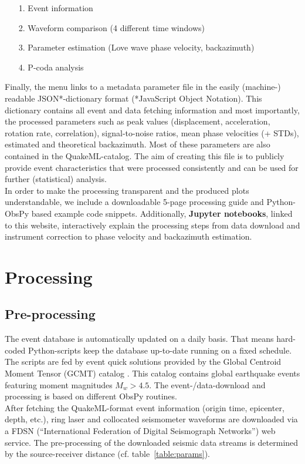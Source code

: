 \documentclass[12pt,reqno,letter]{article}
\begin{document}
\begin{itemize}
	\item[1.] Event information
	\item[2.] Waveform comparison (4 different time windows)
	\item[3.] Parameter estimation (Love wave phase velocity, backazimuth)
	\item[4.] P-coda analysis
\end{itemize}

Finally, the menu links to a metadata parameter file in the easily (machine-) readable JSON*-dictionary format (*JavaScript Object Notation). This dictionary contains all event and data fetching information and most importantly, the processed parameters such as  peak values (displacement, acceleration, rotation rate, correlation), signal-to-noise ratios, mean phase velocities (+ STDs), estimated and theoretical backazimuth. Most of these parameters are also contained in the QuakeML-catalog.
The aim of creating this file is to publicly provide event characteristics that were processed consistently and can be used for further (statistical) analysis.\\
In order to make the processing transparent and the produced plots understandable, we include a downloadable 5-page processing guide  and Python-ObsPy based example code snippets. Additionally, \textbf{Jupyter notebooks}, linked to this website, interactively explain the processing steps from data download and instrument correction to phase velocity and backazimuth estimation.
%
%
\section*{Processing}
\label{sec:processing}
\subsection*{Pre-processing}
The event database is automatically updated on a daily basis. That means hard-coded Python-scripts keep the database up-to-date running on a fixed schedule. The scripts are fed by event quick solutions provided by the Global Centroid Moment Tensor (GCMT) catalog \citep{Dziewonski1981, Ekstroem2012}. This catalog contains global earthquake events featuring moment magnitudes $M_w > 4.5$. The event-/data-download and processing is based on different ObsPy routines.\\
After fetching the QuakeML-format event information (origin time, epicenter, depth, etc.), ring laser and collocated seismometer waveforms are downloaded via a FDSN (“International Federation of Digital Seismograph Networks”) web service.
The pre-processing of the downloaded seismic data streams is determined by the source-receiver distance (cf. table~\ref{table:params}).
\end{document}
